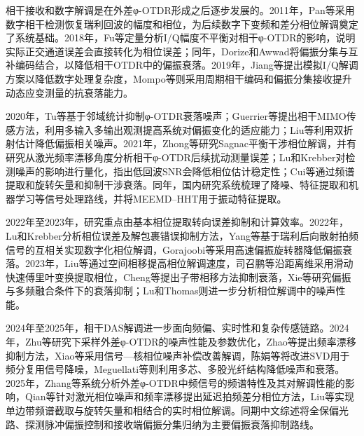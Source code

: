 相干接收和数字解调是在外差φ-OTDR形成之后逐步发展的。2011年，Pan等采用数字相干检测恢复瑞利回波的幅度和相位，为后续数字下变频和差分相位解调奠定了系统基础\cite{pan2011phase}。2018年，Fu等定量分析I/Q幅度不平衡对相干φ-OTDR的影响，说明实际正交通道误差会直接转化为相位误差\cite{fu2018iq}；同年，Dorize和Awwad将偏振分集与互补编码结合，以降低相干OTDR中的偏振衰落\cite{dorize2018polarization}。2019年，Jiang等提出模拟I/Q解调方案以降低数字处理复杂度\cite{jiang2019analog}，Mompo等则采用周期相干编码和偏振分集接收提升动态应变测量的抗衰落能力\cite{mompo2019distributed}。

2020年，Tu等基于邻域统计抑制φ-OTDR衰落噪声\cite{tu2020fading}；Guerrier等提出相干MIMO传感方法，利用多输入多输出观测提高系统对偏振变化的适应能力\cite{guerrier2020mimo}；Liu等利用双折射估计降低偏振相关噪声\cite{liu2020polarization}。2021年，Zhong等研究Sagnac平衡干涉相位解调\cite{zhong2021sagnac}，并有研究从激光频率漂移角度分析相干φ-OTDR后续扰动测量误差\cite{zhong2021frequency}；Lu和Krebber对检测噪声的影响进行量化，指出低回波SNR会降低相位估计稳定性\cite{lu2021detection}；Cui等通过频谱提取和旋转矢量和抑制干涉衰落\cite{cui2021interference}。同年，国内研究系统梳理了降噪、特征提取和机器学习等信号处理路线，并将MEEMD--HHT用于振动特征提取\cite{tian2021signal_cn,wu2021processing_cn,yu2021meemd_cn}。

2022年至2023年，研究重点由基本相位提取转向误差抑制和计算效率。2022年，Lu和Krebber分析相位误差及解包裹错误抑制方法\cite{lu2022phaseerror}，Yang等基于瑞利后向散射拍频信号的互相关实现数字化相位解调\cite{yang2022digitalized}，Gorajoobi等采用高速偏振旋转器降低偏振衰落\cite{gorajoobi2022polarization}。2023年，Liu等通过空间相移提高相位解调速度\cite{liu2023spatial}，司召鹏等沿距离维采用滑动快速傅里叶变换提取相位\cite{si2023fft_cn}，Cheng等提出子带相移方法抑制衰落\cite{cheng2023subband}，Xie等研究偏振与多频融合条件下的衰落抑制\cite{xie2023fading}；Lu和Thomas则进一步分析相位解调中的噪声性能\cite{lu2023phase}。

2024年至2025年，相干DAS解调进一步面向频偏、实时性和复杂传感链路。2024年，Zhu等研究下采样外差φ-OTDR的噪声性能及参数优化\cite{zhu2024downsampling}，Zhao等提出频率漂移抑制方法\cite{zhao2024frequency}，Xiao等采用信号—核相位噪声补偿改善解调\cite{xiao2024signal}，陈娟等将改进SVD用于频分复用信号降噪\cite{chen2024svd_cn}，Meguellati等则利用多芯、多股光纤结构降低噪声和衰落\cite{meguellati2024noise}。2025年，Zhang等系统分析外差φ-OTDR中频信号的频谱特性及其对解调性能的影响\cite{zhang2025if}，Qian等针对激光相位噪声和频率漂移提出延迟拍频差分相位方法\cite{qian2025drift}，Liu等实现单边带频谱截取与旋转矢量和相结合的实时相位解调\cite{liu2025realtime}。同期中文综述将全保偏光路、探测脉冲偏振控制和接收端偏振分集归纳为主要偏振衰落抑制路线\cite{lei2025fading_cn}。

